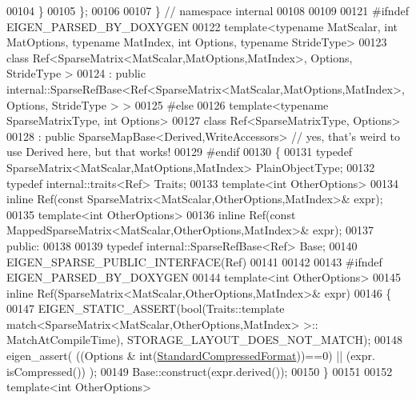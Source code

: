 \begin{DoxyCode}
00104   \}
00105 \};
00106 
00107 \} \textcolor{comment}{// namespace internal}
00108 
00109 
00121 \textcolor{preprocessor}{#ifndef EIGEN\_PARSED\_BY\_DOXYGEN}
00122 \textcolor{keyword}{template}<\textcolor{keyword}{typename} MatScalar, \textcolor{keywordtype}{int} MatOptions, \textcolor{keyword}{typename} MatIndex, \textcolor{keywordtype}{int} Options, \textcolor{keyword}{typename} Str\textcolor{keywordtype}{id}eType>
00123 \textcolor{keyword}{class }Ref<SparseMatrix<MatScalar,MatOptions,MatIndex>, Options, StrideType >
00124   : \textcolor{keyword}{public} internal::SparseRefBase<Ref<SparseMatrix<MatScalar,MatOptions,MatIndex>, Options, StrideType > >
00125 \textcolor{preprocessor}{#else}
00126 template<typename SparseMatrixType, int Options>
00127 class Ref<SparseMatrixType, Options>
00128   : \textcolor{keyword}{public} SparseMapBase<Derived,WriteAccessors> \textcolor{comment}{// yes, that's weird to use Derived here, but that works!}
00129 \textcolor{preprocessor}{#endif}
00130 \{
00131     \textcolor{keyword}{typedef} SparseMatrix<MatScalar,MatOptions,MatIndex> PlainObjectType;
00132     \textcolor{keyword}{typedef} internal::traits<Ref> Traits;
00133     \textcolor{keyword}{template}<\textcolor{keywordtype}{int} OtherOptions>
00134     \textcolor{keyword}{inline} Ref(\textcolor{keyword}{const} SparseMatrix<MatScalar,OtherOptions,MatIndex>& expr);
00135     \textcolor{keyword}{template}<\textcolor{keywordtype}{int} OtherOptions>
00136     \textcolor{keyword}{inline} Ref(\textcolor{keyword}{const} MappedSparseMatrix<MatScalar,OtherOptions,MatIndex>& expr);
00137   \textcolor{keyword}{public}:
00138 
00139     \textcolor{keyword}{typedef} internal::SparseRefBase<Ref> Base;
00140     EIGEN\_SPARSE\_PUBLIC\_INTERFACE(Ref)
00141 
00142 
00143     \textcolor{preprocessor}{#ifndef EIGEN\_PARSED\_BY\_DOXYGEN}
00144     \textcolor{keyword}{template}<\textcolor{keywordtype}{int} OtherOptions>
00145     \textcolor{keyword}{inline} Ref(SparseMatrix<MatScalar,OtherOptions,MatIndex>& expr)
00146     \{
00147       EIGEN\_STATIC\_ASSERT(\textcolor{keywordtype}{bool}(Traits::template match<SparseMatrix<MatScalar,OtherOptions,MatIndex> >::
      MatchAtCompileTime), STORAGE\_LAYOUT\_DOES\_NOT\_MATCH);
00148       eigen\_assert( ((Options & \textcolor{keywordtype}{int}(\hyperlink{namespace_eigen_a668ffb0fb66c55c1c98bd35c52df648eaf81fc519ed9cc0ebc6aac69a366086a5}{StandardCompressedFormat}))==0) || (expr.
      isCompressed()) );
00149       Base::construct(expr.derived());
00150     \}
00151     
00152     \textcolor{keyword}{template}<\textcolor{keywordtype}{int} OtherOptions>

\end{DoxyCode}
